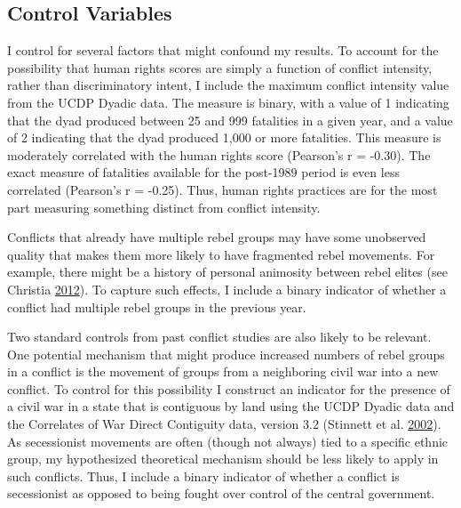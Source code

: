 \documentclass[12pt,]{book}
\theoremstyle{definition}
\theoremstyle{definition}
\theoremstyle{definition}
\theoremstyle{remark}
\begin{document}
\hypertarget{control-variables-1}{%
\subsection{Control Variables}\label{control-variables-1}}

I control for several factors that might confound my results. To account
for the possibility that human rights scores are simply a function of
conflict intensity, rather than discriminatory intent, I include the
maximum conflict intensity value from the UCDP Dyadic data. The measure
is binary, with a value of 1 indicating that the dyad produced between
25 and 999 fatalities in a given year, and a value of 2 indicating that
the dyad produced 1,000 or more fatalities. This measure is moderately
correlated with the human rights score (Pearson's r = -0.30). The exact
measure of fatalities available for the post-1989 period is even less
correlated (Pearson's r = -0.25). Thus, human rights practices are for
the most part measuring something distinct from conflict intensity.

Conflicts that already have multiple rebel groups may have some
unobserved quality that makes them more likely to have fragmented rebel
movements. For example, there might be a history of personal animosity
between rebel elites (see Christia
\protect\hyperlink{ref-Christia2012}{2012}). To capture such effects, I
include a binary indicator of whether a conflict had multiple rebel
groups in the previous year.

Two standard controls from past conflict studies are also likely to be
relevant. One potential mechanism that might produce increased numbers
of rebel groups in a conflict is the movement of groups from a
neighboring civil war into a new conflict. To control for this
possibility I construct an indicator for the presence of a civil war in
a state that is contiguous by land using the UCDP Dyadic data and the
Correlates of War Direct Contiguity data, version 3.2 (Stinnett et al.
\protect\hyperlink{ref-Stinnett2002a}{2002}). As secessionist movements
are often (though not always) tied to a specific ethnic group, my
hypothesized theoretical mechanism should be less likely to apply in
such conflicts. Thus, I include a binary indicator of whether a conflict
is secessionist as opposed to being fought over control of the central
government.
\end{document}
